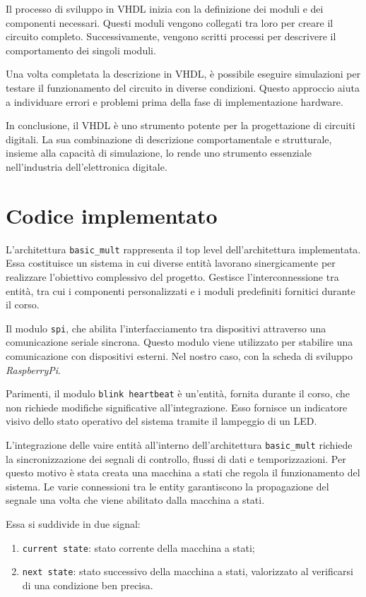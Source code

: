 \documentclass[titlepage]{report}
\begin{document}
		Il processo di sviluppo in VHDL inizia con la definizione dei moduli e dei componenti necessari. Questi moduli vengono collegati tra loro per creare il circuito completo. Successivamente, vengono scritti processi per descrivere il comportamento dei singoli moduli.

		Una volta completata la descrizione in VHDL, è possibile eseguire simulazioni per testare il funzionamento del circuito in diverse condizioni. Questo approccio aiuta a individuare errori e problemi prima della fase di implementazione hardware.

		In conclusione, il VHDL è uno strumento potente per la progettazione di circuiti digitali. La sua combinazione di descrizione comportamentale e strutturale, insieme alla capacità di simulazione, lo rende uno strumento essenziale nell'industria dell'elettronica digitale.
	\section{Codice implementato}
	\label{sec:vhdl_code}
		
		L'architettura \texttt{basic\_mult} rappresenta il top level dell'architettura implementata. Essa costituisce un sistema in cui diverse entità lavorano sinergicamente per realizzare l'obiettivo complessivo del progetto.
		Gestisce l'interconnessione tra entità, tra cui i componenti personalizzati e i moduli predefiniti fornitici durante il corso.
		
		Il modulo \texttt{spi}, che abilita l'interfacciamento tra dispositivi attraverso una comunicazione seriale sincrona. Questo modulo viene utilizzato per stabilire una comunicazione con dispositivi esterni. Nel nostro caso, con la scheda di sviluppo \textit{RaspberryPi}.

		Parimenti, il modulo \texttt{blink heartbeat} è un'entità, fornita durante il corso, che non richiede modifiche significative all'integrazione. Esso fornisce un indicatore visivo dello stato operativo del sistema tramite il lampeggio di un LED.

		L'integrazione delle vaire entità all'interno dell'architettura \texttt{basic\_mult} richiede la sincronizzazione dei segnali di controllo, flussi di dati e temporizzazioni.
		Per questo motivo è stata creata una macchina a stati che regola il funzionamento del sistema. Le varie connessioni tra le entity garantiscono la propagazione del segnale una volta che viene abilitato dalla macchina a stati.

		Essa si suddivide in due signal:
		\begin{enumerate}
			\item \texttt{current state}: stato corrente della macchina a stati;
			\item \texttt{next state}: stato successivo della macchina a stati, valorizzato al verificarsi di una condizione ben precisa.
		\end{enumerate}
\end{document}
